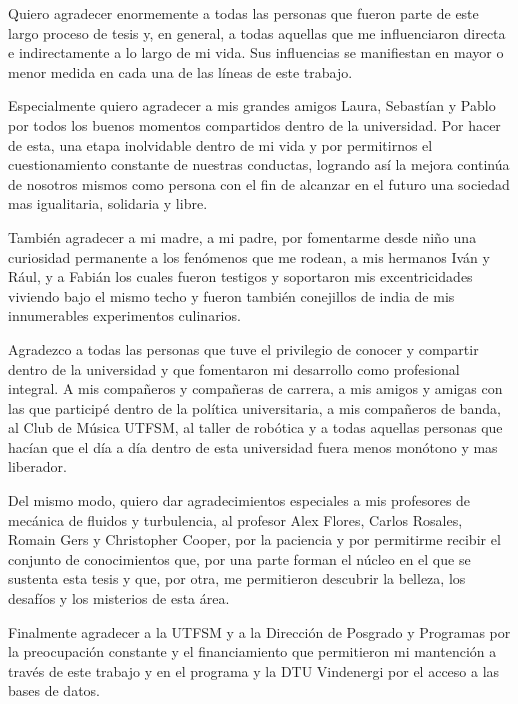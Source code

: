 \vspace{-1.5cm}

Quiero agradecer enormemente a todas las personas que fueron parte de este largo proceso de tesis y, en general, a todas aquellas que me influenciaron directa e indirectamente a lo largo de mi vida. Sus influencias se manifiestan en mayor o menor medida en cada una de las líneas de este trabajo. 

Especialmente quiero agradecer a mis grandes amigos Laura, Sebastían y Pablo por todos los buenos momentos compartidos dentro de la universidad. Por hacer de esta, una etapa inolvidable dentro de mi vida y por permitirnos el cuestionamiento constante de nuestras conductas, logrando así la mejora continúa de nosotros mismos como persona con el fin de alcanzar en el futuro una sociedad mas igualitaria, solidaria y libre. 

También agradecer a mi madre, a mi padre, por fomentarme desde niño una curiosidad permanente a los fenómenos que me rodean, a mis hermanos Iván y Rául, y a Fabián los cuales fueron testigos y soportaron mis excentricidades viviendo bajo el mismo techo y fueron también conejillos de india de mis innumerables experimentos culinarios.

Agradezco a todas las personas que tuve el privilegio de conocer y compartir dentro de la universidad y que fomentaron mi desarrollo como profesional integral. A mis compañeros y compañeras de carrera, a mis amigos y amigas con las que participé dentro de la política universitaria, a mis compañeros de banda, al Club de Música UTFSM, al taller de robótica y a todas aquellas personas que hacían que el día a día dentro de esta universidad fuera menos monótono y mas liberador. 

Del mismo modo, quiero dar agradecimientos especiales a mis profesores de mecánica de fluidos y turbulencia, al profesor Alex Flores, Carlos Rosales, Romain Gers y Christopher Cooper, por la paciencia y por permitirme recibir el conjunto de conocimientos que, por una parte forman el núcleo en el que se sustenta esta tesis y que, por otra, me permitieron descubrir la belleza, los desafíos y los misterios de esta área.

Finalmente agradecer a la UTFSM y a la Dirección de Posgrado y Programas por la preocupación constante y el financiamiento que permitieron mi mantención a través de este trabajo y en el programa y la DTU Vindenergi por el acceso a las bases de datos.
